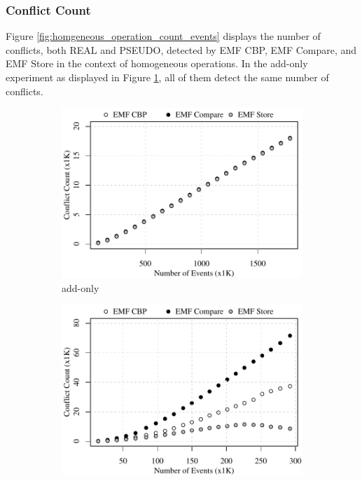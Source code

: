 \subsubsection{Conflict Count}
\label{sec:conflict_count}
Figure \ref{fig:homgeneous_operation_count_events} displays the number of conflicts, both \textsf{REAL} and \textsf{PSEUDO}, detected by EMF CBP, EMF Compare, and EMF Store in the context of homogeneous operations. In the add-only experiment as displayed in Figure \ref{fig:add-conflict-count-events}, all of them detect the same number of conflicts.

\begin{figure}[ht]
\centering
\begin{subfigure}[t]{0.490\linewidth}
	\includegraphics[width=\linewidth]{add-conflict-count-events}
	\caption{add-only}
	\label{fig:add-conflict-count-events}
\end{subfigure}
\hfill
\begin{subfigure}[t]{0.490\linewidth}
	\includegraphics[width=\linewidth]{delete-conflict-count-events}

\end{subfigure}
\end{figure}
